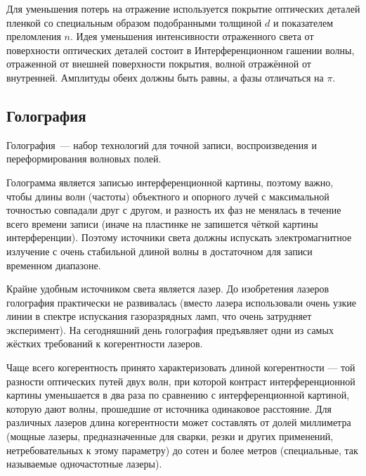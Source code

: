 \documentclass[a4paper, 12pt]{extarticle}
\begin{document}
  Для уменьшения потерь на отражение используется покрытие оптических деталей пленкой со специальным
  образом подобранными толщиной $d$ и показателем преломления $n$.  Идея уменьшения интенсивности
  отраженного света от поверхности оптических деталей состоит в Интерференционном гашении волны,
  отраженной от внешней поверхности покрытия, волной отражённой от внутренней.  Амплитуды обеих
  должны быть равны, а фазы отличаться на $\pi$.

  \subsection{Голография}

  Голография~--- набор технологий для точной записи, воспроизведения и переформирования волновых полей.

  Голограмма является записью интерференционной картины, поэтому важно, чтобы длины волн (частоты)
  объектного и опорного лучей с максимальной точностью совпадали друг с другом, и разность их фаз не
  менялась в течение всего времени записи (иначе на пластинке не запишется чёткой картины
  интерференции). Поэтому источники света должны испускать электромагнитное излучение с очень
  стабильной длиной волны в достаточном для записи временном диапазоне.

  Крайне удобным источником света является лазер. До изобретения лазеров голография практически не
  развивалась (вместо лазера использовали очень узкие линии в спектре испускания газоразрядных ламп,
  что очень затрудняет эксперимент). На сегодняшний день голография предъявляет одни из самых
  жёстких требований к когерентности лазеров.

  Чаще всего когерентность принято характеризовать длиной когерентности — той разности оптических
  путей двух волн, при которой контраст интерференционной картины уменьшается в два раза по
  сравнению с интерференционной картиной, которую дают волны, прошедшие от источника одинаковое
  расстояние. Для различных лазеров длина когерентности может составлять от долей миллиметра (мощные
  лазеры, предназначенные для сварки, резки и других применений, нетребовательных к этому параметру)
  до сотен и более метров (специальные, так называемые одночастотные лазеры).
\end{document}
